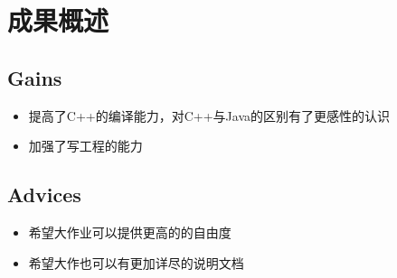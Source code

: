 \chapter{成果概述}
\section{Gains}

\begin{itemize}
\item 提高了C++的编译能力，对C++与Java的区别有了更感性的认识
\item 加强了写工程的能力
\end{itemize}

\section{Advices}

\begin{itemize}
\item 希望大作业可以提供更高的的自由度
\item 希望大作也可以有更加详尽的说明文档
\end{itemize}
